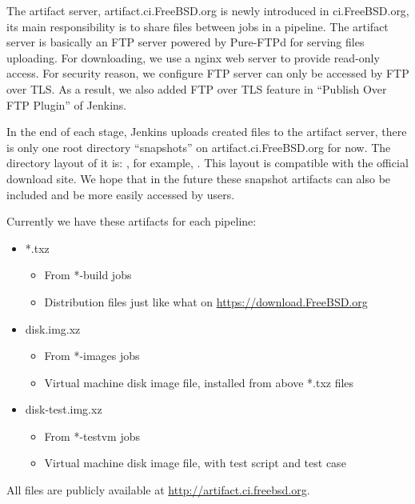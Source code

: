 \documentclass[a4paper,twocolumn,10pt]{article}
\begin{document}
The artifact server, artifact.ci.FreeBSD.org is newly introduced in
ci.FreeBSD.org, its main responsibility is to share files between jobs in a
pipeline.  The artifact server is basically an FTP server powered by Pure-FTPd
for serving files uploading.  For downloading, we use a nginx \cite{nginx} web
server to provide read-only access.  For security reason, we configure FTP
server can only be accessed by FTP over TLS.  As a result, we also added FTP
over TLS feature in ``Publish Over FTP Plugin''
\cite{jenkoins-publish-over-ftp} of Jenkins.

In the end of each stage, Jenkins uploads created files to the artifact server,
there is only one root directory ``snapshots'' on artifact.ci.FreeBSD.org for
now.  The directory layout of it is:
, for example,
 . This layout is compatible with the official
download site. We hope that in the future these snapshot artifacts can also be
included and be more easily accessed by users.

Currently we have these artifacts for each pipeline:

\begin{itemize}
\item *.txz
  \begin{itemize}
  \item From *-build jobs
  \item Distribution files just like what on \url{https://download.FreeBSD.org}
  \end{itemize}
\item disk.img.xz
  \begin{itemize}
  \item From *-images jobs
  \item Virtual machine disk image file, installed from above *.txz files
  \end{itemize}
\item disk-test.img.xz
  \begin{itemize}
  \item From *-testvm jobs
  \item Virtual machine disk image file, with test script and test case
  \end{itemize}
\end{itemize}

All files are publicly available at \url{http://artifact.ci.freebsd.org}.
\end{document}
